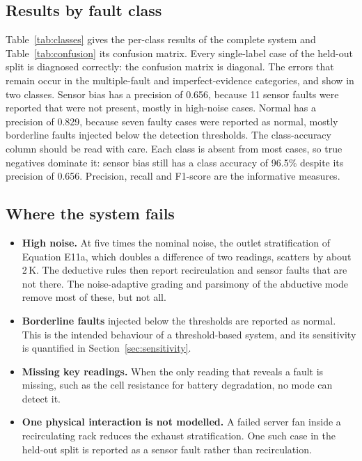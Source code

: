 \subsection{Results by fault class}

Table~\ref{tab:classes} gives the per-class results of the complete system and Table~\ref{tab:confusion} its confusion matrix. Every single-label case of the held-out split is diagnosed correctly: the confusion matrix is diagonal. The errors that remain occur in the multiple-fault and imperfect-evidence categories, and show in two classes. Sensor bias has a precision of 0.656, because 11 sensor faults were reported that were not present, mostly in high-noise cases. Normal has a precision of 0.829, because seven faulty cases were reported as normal, mostly borderline faults injected below the detection thresholds. The class-accuracy column should be read with care. Each class is absent from most cases, so true negatives dominate it: sensor bias still has a class accuracy of 96.5\% despite its precision of 0.656. Precision, recall and F1-score are the informative measures.




\subsection{Where the system fails}

\begin{itemize}
  \item \textbf{High noise.} At five times the nominal noise, the outlet stratification of Equation E11a, which doubles a difference of two readings, scatters by about 2\,K. The deductive rules then report recirculation and sensor faults that are not there. The noise-adaptive grading and parsimony of the abductive mode remove most of these, but not all.
  \item \textbf{Borderline faults} injected below the thresholds are reported as normal. This is the intended behaviour of a threshold-based system, and its sensitivity is quantified in Section~\ref{sec:sensitivity}.
  \item \textbf{Missing key readings.} When the only reading that reveals a fault is missing, such as the cell resistance for battery degradation, no mode can detect it.
  \item \textbf{One physical interaction is not modelled.} A failed server fan inside a recirculating rack reduces the exhaust stratification. One such case in the held-out split is reported as a sensor fault rather than recirculation.
\end{itemize}


